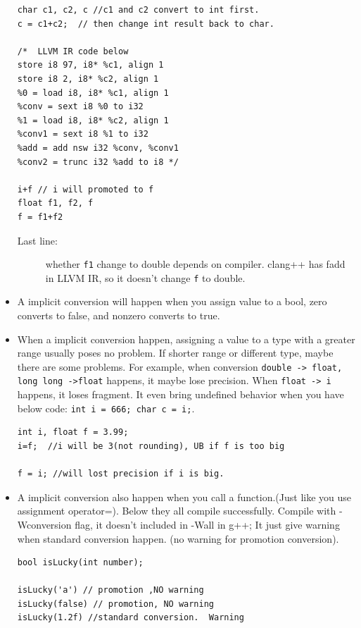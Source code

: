 \documentclass[a4paper,11pt,twoside]{book}
\begin{document}
\begin{itemize}
\begin{lstlisting}
char c1, c2, c //c1 and c2 convert to int first.
c = c1+c2;  // then change int result back to char.

/*  LLVM IR code below
store i8 97, i8* %c1, align 1
store i8 2, i8* %c2, align 1
%0 = load i8, i8* %c1, align 1
%conv = sext i8 %0 to i32
%1 = load i8, i8* %c2, align 1
%conv1 = sext i8 %1 to i32
%add = add nsw i32 %conv, %conv1
%conv2 = trunc i32 %add to i8 */

i+f // i will promoted to f
float f1, f2, f
f = f1+f2  
\end{lstlisting}
	
	\begin{description}
		\item[Last line:] whether \texttt{f1} change to double depends on compiler. clang++ has fadd in LLVM IR, so it doesn't change \texttt{f} to double.
	\end{description}
	
	\item A implicit conversion will happen when you assign value to a bool, zero converts to false, and nonzero converts to true.
	
	\item When a implicit conversion happen, assigning a value to a type with a greater range usually poses no problem. If shorter range or different type, maybe there are some problems. For example, when conversion \texttt{double -> float, long long ->float} happens, it maybe lose precision. When \texttt{float -> i} happens, it loses fragment. It even bring undefined behavior when you have below code: \texttt{int i = 666; char c = i;}.
	
\begin{lstlisting}
int i, float f = 3.99;
i=f;  //i will be 3(not rounding), UB if f is too big

f = i; //will lost precision if i is big.
\end{lstlisting}
	
	\item A implicit conversion also happen when you call a function.(Just like you use assignment operator=). Below they all compile successfully. Compile with -Wconversion flag, it doesn't included in -Wall in g++; It just give warning when standard conversion happen. (no warning for promotion conversion).

\begin{lstlisting}[numbers=none]
bool isLucky(int number);

isLucky('a') // promotion ,NO warning
isLucky(false) // promotion, NO warning
isLucky(1.2f) //standard conversion.  Warning
\end{lstlisting}
	

\end{itemize}
\end{document}
